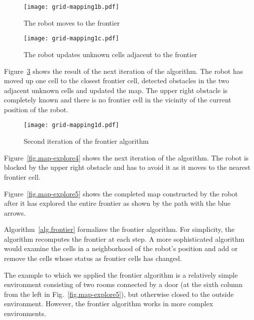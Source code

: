 \begin{figure}
\begin{center}
\texttt{[image: grid-mapping1b.pdf]}
\end{center}
\caption{The robot moves to the frontier}\label{fig.map-explore1}
\end{figure}

\begin{figure}
\begin{center}
\texttt{[image: grid-mapping1c.pdf]}
\end{center}
\caption{The robot updates unknown cells adjacent to the frontier}\label{fig.map-explore2}
\end{figure}

Figure~\ref{fig.map-explore3} shows the result of the next iteration of the algorithm. The robot has moved up one cell to the closest frontier cell, detected obstacles in the two adjacent unknown cells and updated the map. The upper right obstacle is completely known and there is no frontier cell in the vicinity of the current position of the robot.

\begin{figure}
\begin{center}
\texttt{[image: grid-mapping1d.pdf]}
\end{center}
\caption{Second iteration of the frontier algorithm}\label{fig.map-explore3}
\end{figure}

Figure~\ref{fig.map-explore4} shows the next iteration of the algorithm. The robot is blocked by the upper right obstacle and has to avoid it as it moves to the nearest frontier cell.

Figure~\ref{fig.map-explore5} shows the completed map constructed by the robot after it has explored the entire frontier as shown by the path with the blue arrows. 

Algorithm~\ref{alg.frontier} formalizes the frontier algorithm. For simplicity, the algorithm recomputes the frontier at each step. A more sophisticated algorithm would examine the cells in a neighborhood of the robot's position and add or remove the cells whose status as frontier cells has changed.

The example to which we applied the frontier algorithm is a relatively simple environment consisting of two rooms connected by a door (at the sixth column from the left in Fig.~\ref{fig.map-explore5}), but otherwise closed to the outside environment. However, the frontier algorithm works in more complex environments. 

